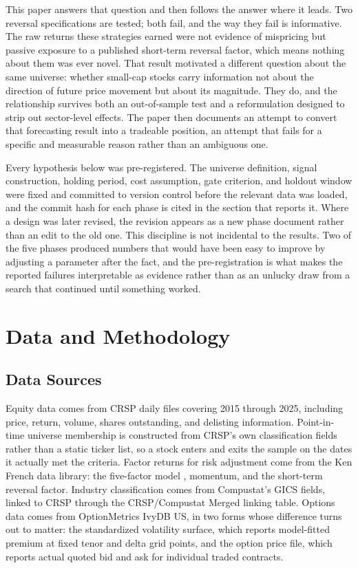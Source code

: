 \documentclass[11pt]{article}
\begin{document}
This paper answers that question and then follows the answer where it leads. Two reversal specifications are tested; both fail, and the way they fail is informative. The raw returns these strategies earned were not evidence of mispricing but passive exposure to a published short-term reversal factor, which means nothing about them was ever novel. That result motivated a different question about the same universe: whether small-cap stocks carry information not about the direction of future price movement but about its magnitude. They do, and the relationship survives both an out-of-sample test and a reformulation designed to strip out sector-level effects. The paper then documents an attempt to convert that forecasting result into a tradeable position, an attempt that fails for a specific and measurable reason rather than an ambiguous one.

Every hypothesis below was pre-registered. The universe definition, signal construction, holding period, cost assumption, gate criterion, and holdout window were fixed and committed to version control before the relevant data was loaded, and the commit hash for each phase is cited in the section that reports it. Where a design was later revised, the revision appears as a new phase document rather than an edit to the old one. This discipline is not incidental to the results. Two of the five phases produced numbers that would have been easy to improve by adjusting a parameter after the fact, and the pre-registration is what makes the reported failures interpretable as evidence rather than as an unlucky draw from a search that continued until something worked.

\section{Data and Methodology}
\subsection{Data Sources}

Equity data comes from CRSP daily files covering 2015 through 2025, including price, return, volume, shares outstanding, and delisting information. Point-in-time universe membership is constructed from CRSP's own classification fields rather than a static ticker list, so a stock enters and exits the sample on the dates it actually met the criteria. Factor returns for risk adjustment come from the Ken French data library: the five-factor model \citep{fama2015}, momentum, and the short-term reversal factor. Industry classification comes from Compustat's GICS fields, linked to CRSP through the CRSP/Compustat Merged linking table. Options data comes from OptionMetrics IvyDB US, in two forms whose difference turns out to matter: the standardized volatility surface, which reports model-fitted premium at fixed tenor and delta grid points, and the option price file, which reports actual quoted bid and ask for individual traded contracts.
\end{document}
